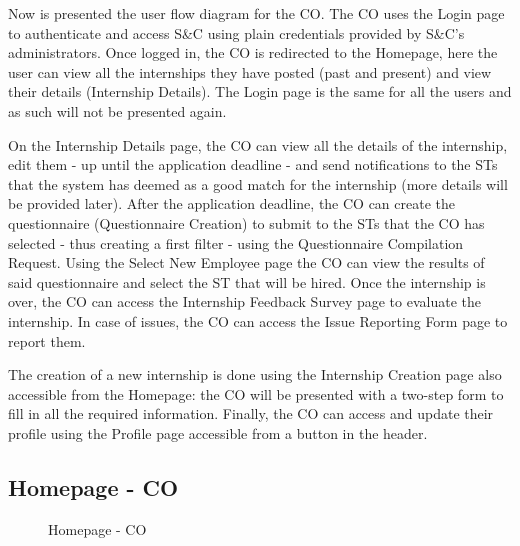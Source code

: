 \par Now is presented the user flow diagram for the CO. The CO uses the Login page to authenticate and access S\&C
using plain credentials provided by S\&C's administrators. Once logged in, the CO is redirected to the Homepage, here
the user can view all the internships they have posted (past and present) and view their details (Internship Details).
The Login page is the same for all the users and as such will not be presented again.

\par On the Internship Details page, the CO can view all the details of the internship, edit them - up until the
application deadline - and send notifications to the STs that the system has deemed as a good match for the internship
(more details will be provided later). After the application deadline, the CO can create the questionnaire
(Questionnaire Creation) to submit to the STs that the CO has selected - thus creating a first filter - using the
Questionnaire Compilation Request. Using the Select New Employee page the CO can view the results of said
questionnaire and select the ST that will be hired. Once the internship is over, the CO can access the Internship
Feedback Survey page to evaluate the internship. In case of issues, the CO can access the Issue Reporting Form page
to report them.

\par The creation of a new internship is done using the Internship Creation page also accessible from the Homepage: the
CO will be presented with a two-step form to fill in all the required information. Finally, the CO can access and
update their profile using the Profile page accessible from a button in the header.

\subsection{Homepage - CO}
\label{subsec:homepage-co}%

\begin{figure}[H]
    \centering
    \caption{Homepage - CO}
    \label{fig:homepage-co}
\end{figure}

